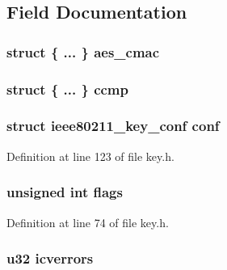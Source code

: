 \subsection{Field Documentation}
\hypertarget{structieee80211__key_affdec9171aa9c62e512d1080c1c45e2a}{
\subsubsection[{aes\-\_\-cmac}]{\setlength{\rightskip}{0pt plus 5cm}struct \{ ... \}   aes\-\_\-cmac}}\label{structieee80211__key_affdec9171aa9c62e512d1080c1c45e2a}
\hypertarget{structieee80211__key_a7f707fa843bd338b94e1d10d95e88f11}{
\subsubsection[{ccmp}]{\setlength{\rightskip}{0pt plus 5cm}struct \{ ... \}   ccmp}}\label{structieee80211__key_a7f707fa843bd338b94e1d10d95e88f11}
\hypertarget{structieee80211__key_ac356e71d3ee661c89f43f272674ca2d6}{
\subsubsection[{conf}]{\setlength{\rightskip}{0pt plus 5cm}struct ieee80211\-\_\-key\-\_\-conf conf}}\label{structieee80211__key_ac356e71d3ee661c89f43f272674ca2d6}


Definition at line 123 of file key.\-h.

\hypertarget{structieee80211__key_ac92588540e8c1d014a08cd8a45462b19}{
\subsubsection[{flags}]{\setlength{\rightskip}{0pt plus 5cm}unsigned int flags}}\label{structieee80211__key_ac92588540e8c1d014a08cd8a45462b19}


Definition at line 74 of file key.\-h.

\hypertarget{structieee80211__key_a6751db90f0ca17fdb752baeb6f8d5152}{
\subsubsection[{icverrors}]{\setlength{\rightskip}{0pt plus 5cm}u32 icverrors}}\label{structieee80211__key_a6751db90f0ca17fdb752baeb6f8d5152}


